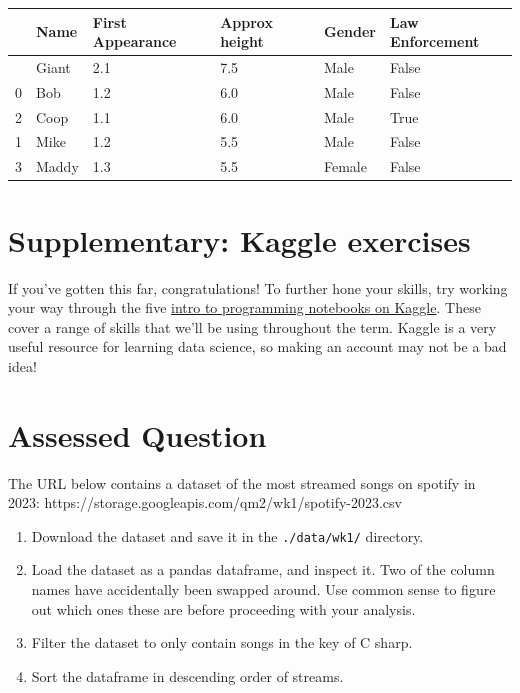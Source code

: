 \documentclass[
  letterpaper,
  DIV=11,
  numbers=noendperiod]{scrreprt}
\providecommand{\tightlist}{%
  \setlength{\itemsep}{0pt}\setlength{\parskip}{0pt}}\usepackage{longtable,booktabs,array}
\begin{document}
\begin{longtable}[]{@{}llllll@{}}
\toprule\noalign{}
& Name & First Appearance & Approx height & Gender & Law Enforcement \\
\midrule\noalign{}
\endhead
\bottomrule\noalign{}
\endlastfoot
4 & Giant & 2.1 & 7.5 & Male & False \\
0 & Bob & 1.2 & 6.0 & Male & False \\
2 & Coop & 1.1 & 6.0 & Male & True \\
1 & Mike & 1.2 & 5.5 & Male & False \\
3 & Maddy & 1.3 & 5.5 & Female & False \\
\end{longtable}


\hypertarget{supplementary-kaggle-exercises}{%
\chapter{Supplementary: Kaggle
exercises}\label{supplementary-kaggle-exercises}}

If you've gotten this far, congratulations! To further hone your skills,
try working your way through the five
\href{https://www.kaggle.com/learn/intro-to-programming}{intro to
programming notebooks on Kaggle}. These cover a range of skills that
we'll be using throughout the term. Kaggle is a very useful resource for
learning data science, so making an account may not be a bad idea!


\hypertarget{assessed-question}{%
\chapter{Assessed Question}\label{assessed-question}}

The URL below contains a dataset of the most streamed songs on spotify
in 2023: https://storage.googleapis.com/qm2/wk1/spotify-2023.csv

\begin{enumerate}
\def\labelenumi{\arabic{enumi}.}
\tightlist
\item
  Download the dataset and save it in the \texttt{./data/wk1/}
  directory.
\item
  Load the dataset as a pandas dataframe, and inspect it. Two of the
  column names have accidentally been swapped around. Use common sense
  to figure out which ones these are before proceeding with your
  analysis.
\item
  Filter the dataset to only contain songs in the key of C sharp.
\item
  Sort the dataframe in descending order of streams.
\end{enumerate}
\end{document}
